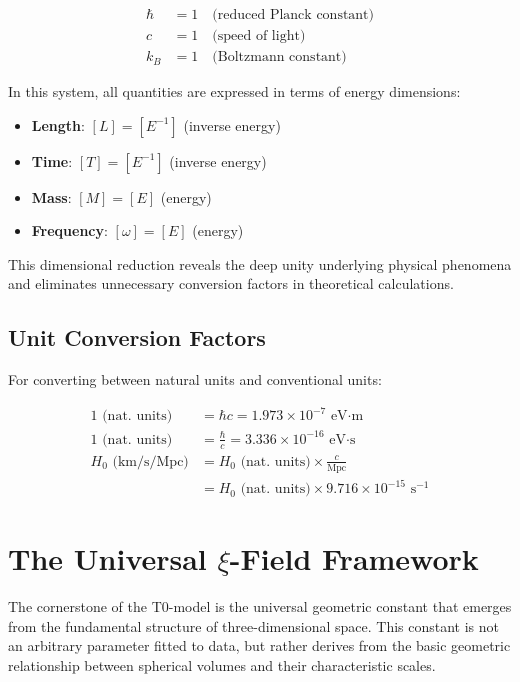 \documentclass[12pt,a4paper]{article}
\begin{document}
	\begin{align}
		\hbar &= 1 \quad \text{(reduced Planck constant)} \\
		c &= 1 \quad \text{(speed of light)} \\
		k_B &= 1 \quad \text{(Boltzmann constant)}
	\end{align}
	
	In this system, all quantities are expressed in terms of energy dimensions:
	\begin{itemize}
		\item \textbf{Length}: $[L] = [E^{-1}]$ (inverse energy)
		\item \textbf{Time}: $[T] = [E^{-1}]$ (inverse energy)
		\item \textbf{Mass}: $[M] = [E]$ (energy)
		\item \textbf{Frequency}: $[\omega] = [E]$ (energy)
	\end{itemize}
	
	This dimensional reduction reveals the deep unity underlying physical phenomena and eliminates unnecessary conversion factors in theoretical calculations.
	
	\subsection{Unit Conversion Factors}
	
	For converting between natural units and conventional units:
	
	\begin{align}
		1 \text{ (nat. units)} &= \hbar c = 1.973 \times 10^{-7} \text{ eV·m} \\
		1 \text{ (nat. units)} &= \frac{\hbar}{c} = 3.336 \times 10^{-16} \text{ eV·s} \\
		H_0 \text{ (km/s/Mpc)} &= H_0 \text{ (nat. units)} \times \frac{c}{\text{Mpc}} \\
		&= H_0 \text{ (nat. units)} \times 9.716 \times 10^{-15} \text{ s}^{-1}
	\end{align}
	
	\section{The Universal $\xi$-Field Framework}
	
	The cornerstone of the T0-model is the universal geometric constant that emerges from the fundamental structure of three-dimensional space. This constant is not an arbitrary parameter fitted to data, but rather derives from the basic geometric relationship between spherical volumes and their characteristic scales.
	
\end{document}
